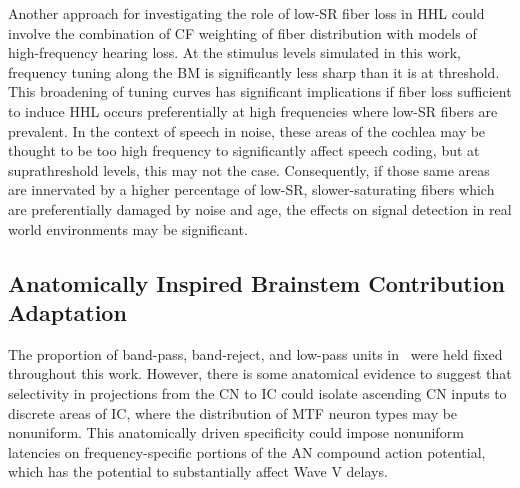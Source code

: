 Another approach for investigating the role of low-SR fiber loss in HHL could involve the combination of CF weighting of fiber distribution with models of high-frequency hearing loss.  At the stimulus levels simulated in this work, frequency tuning along the BM is significantly less sharp than it is at threshold.  This broadening of tuning curves has significant implications if fiber loss sufficient to induce HHL occurs preferentially at high frequencies where low-SR fibers are prevalent.   In the context of speech in noise, these areas of the cochlea may be thought to be too high frequency to significantly affect speech coding, but at suprathreshold levels, this may not the case. Consequently, if those same areas are innervated by a higher percentage of low-SR, slower-saturating fibers which are preferentially damaged by noise and age, the effects on signal detection in real world environments may be significant. 

\subsection{Anatomically Inspired Brainstem Contribution Adaptation} %
\label{sub:anatomically_inspired_brainstem_adaptation}
The proportion of band-pass, band-reject, and low-pass units in~\cite{Carney2015Speech} were held fixed throughout this work.  However, there is some anatomical evidence to suggest that selectivity in projections from the CN to IC could isolate ascending CN inputs to discrete areas of IC, where the distribution of MTF neuron types may be nonuniform.  This anatomically driven specificity could impose nonuniform latencies on frequency-specific portions of the AN compound action potential, which has the potential to substantially affect Wave V delays. 
